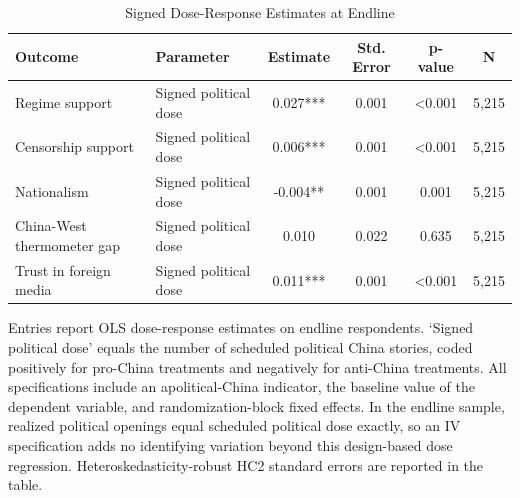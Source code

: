 \begin{table}[H]
\centering
\caption{Signed Dose-Response Estimates at Endline}
\label{tab:signed_dose_response_t1}
\footnotesize
\begin{threeparttable}
\begin{tabular}{llcccc}
\toprule
Outcome & Parameter & Estimate & Std. Error & p-value & N \\
\midrule
Regime support & Signed political dose & 0.027*** & 0.001 & <0.001 & 5,215 \\
Censorship support & Signed political dose & 0.006*** & 0.001 & <0.001 & 5,215 \\
Nationalism & Signed political dose & -0.004** & 0.001 & 0.001 & 5,215 \\
China-West thermometer gap & Signed political dose & 0.010 & 0.022 & 0.635 & 5,215 \\
Trust in foreign media & Signed political dose & 0.011*** & 0.001 & <0.001 & 5,215 \\
\bottomrule
\end{tabular}
\begin{tablenotes}[flushleft]
\footnotesize
\item Entries report OLS dose-response estimates on endline respondents. `Signed political dose' equals the number of scheduled political China stories, coded positively for pro-China treatments and negatively for anti-China treatments. All specifications include an apolitical-China indicator, the baseline value of the dependent variable, and randomization-block fixed effects. In the endline sample, realized political openings equal scheduled political dose exactly, so an IV specification adds no identifying variation beyond this design-based dose regression. Heteroskedasticity-robust HC2 standard errors are reported in the table.
\end{tablenotes}
\end{threeparttable}
\end{table}
